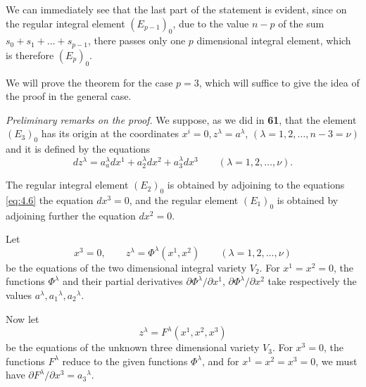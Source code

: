 \documentclass[leqno,11pt]{book}
\numberwithin{equation}{chapter}
\newcommand{\pd}{\partial}
\theoremstyle{shape1}
\theoremstyle{shape0}
\theoremstyle{shape2}
\theoremstyle{definition}
\begin{document}
We can immediately see that the last part of the statement is evident, since on the regular integral element $(E_{p-1})_{0}$, due to the value $n-p$ of the sum $s_{0}+s_{1}+\dots+s_{p-1}$, there passes only one $p$ dimensional integral element, which is therefore $(E_{p})_{0}$.

We will prove the theorem for the case $p=3$, which will suffice to give the idea of the proof in the general case.


\vspace{12pt}\fsec \emph{Preliminary remarks on the proof.} We suppose, as we did in \textsection\textbf{61}, that the element $(E_{3})_{0}$ has its origin at the coordinates $x^{i}=0,z^{\lambda}=a^{\lambda}$, $(\lambda=1,2,\dots,n-3=\nu)$ and it is defined by the equations
\begin{equation}
  \label{eq:4.6}
  dz^{\lambda}=a^{\lambda}_{a}dx^{1}+a^{\lambda}_{2}dx^{2}+a^{\lambda}_{3}dx^{3}\qquad (\lambda=1,2,\dots,\nu).
\end{equation}

The regular integral element $(E_{2})_{0}$ is obtained by adjoining to the equations \eqref{eq:4.6} the equation $dx^{3}=0$, and the regular element $(E_{1})_{0}$ is obtained by adjoining further the equation $dx^{2}=0$.

Let
\[
x^{3}=0,\qquad z^{\lambda}=\Phi^{\lambda}(x^{1},x^{2})\qquad(\lambda=1,2,\dots,\nu)
\]
be the equations of the two dimensional integral variety $V_{2}$. For $x^{1}=x^{2}=0$, the functions $\Phi^{\lambda}$ and their partial derivatives $\pd \Phi^{\lambda}/\pd x^{1}$, $\pd \Phi^{\lambda}/\pd x^{2}$ take respectively the values $a^{\lambda},a_{1}{}^{\lambda},a_{2}{}^{\lambda}$.

Now let
\[
z^{\lambda}=F^{\lambda}(x^{1},x^{2},x^{3})
\]
be the equations of the unknown three dimensional variety $V_{3}$. For $x^{3}=0$, the functions $F^{\lambda}$ reduce to the given functions $\Phi^{\lambda}$, and for $x^{1}=x^{2}=x^{3}=0$, we must have $\pd F^{\lambda}/\pd x^{3}=a_{3}{}^{\lambda}$.
\end{document}
